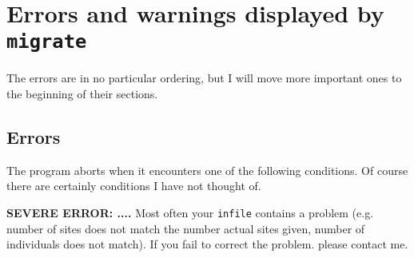\chapter{Errors and warnings displayed by {\tt migrate}}
The errors are in no particular ordering, but
I will move more important ones to the beginning of their sections.

\section{Errors}
The program aborts when it encounters one of the following conditions.
Of course there are certainly conditions
I have not thought of. 

\smallerskip
{\bf SEVERE ERROR: ....}
Most often your {\tt infile} contains a problem (e.g. number of sites
does not match the number actual sites given, number of individuals
does not match). If you fail to correct the problem. please contact me.
 
